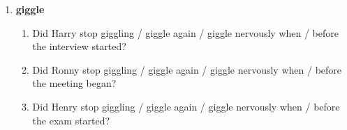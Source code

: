 \documentclass[a4paper,12pt]{article}
\newcommand{\6}{\mbox{$[\hspace*{-.6mm}[$}}
\newcommand{\9}{\mbox{$]\hspace*{-.6mm}]$}}
\begin{document}
\begin{enumerate}[leftmargin=3ex,itemsep=-4pt]
\item {\bf giggle}
\begin{enumerate}[leftmargin=2ex,itemsep=-4pt]
\item Did Harry stop giggling / giggle again / giggle nervously	when / before the interview started?
\item Did Ronny stop giggling	/ giggle again	/ giggle nervously	when / before the meeting began?
\item Did Henry stop giggling / giggle again / giggle nervously	when / before the exam started?

\end{enumerate}
\end{enumerate}




\end{document}
